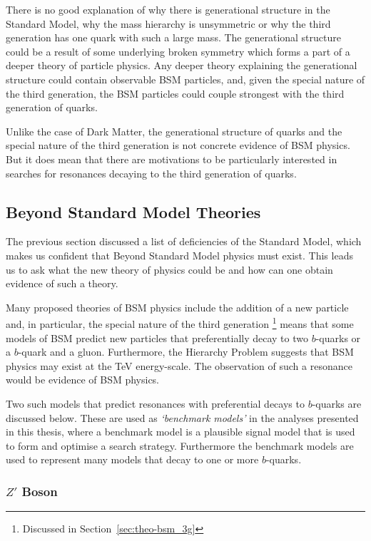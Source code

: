There is no good explanation of why there is generational structure in the Standard Model,
why the mass hierarchy is unsymmetric 
or why the third generation has one quark with such a large mass.
The generational structure could be a result of some underlying broken symmetry
which forms a part of a deeper theory of particle physics.
Any deeper theory explaining the generational structure could contain observable BSM particles,
and, given the special nature of the third generation,
the BSM particles could couple strongest with the third generation of quarks.

Unlike the case of Dark Matter,
the generational structure of quarks
and the special nature of the third generation is not concrete evidence of BSM physics.
But it does mean that there are motivations to be particularly interested in
searches for resonances decaying to the third generation of quarks.

\subsection{Beyond Standard Model Theories}
\label{sec:theo-bsm_models}

The previous section discussed a list of deficiencies of the Standard Model,
which makes us confident that Beyond Standard Model physics must exist.
This leads us to ask what the new theory of physics could be and
how can one obtain evidence of such a theory.

Many proposed theories of BSM physics include the addition of a new particle and,
in particular, the special nature of the third generation
\footnote{Discussed in Section~\ref{sec:theo-bsm_3g}}
means that some models of BSM predict new particles
that preferentially decay to two $b$-quarks or a $b$-quark and a gluon.
Furthermore, the Hierarchy Problem suggests that BSM physics may exist at the TeV energy-scale.
The observation of such a resonance would be evidence of BSM physics.

Two such models that predict resonances with preferential decays to $b$-quarks are discussed below.
These are used as \textit{`benchmark models'} in the analyses presented in this thesis,
where a benchmark model is a plausible signal model that is used to form and optimise a search strategy.
Furthermore the benchmark models are used to represent many models that decay to one or more $b$-quarks.

\subsubsection{$Z'$ Boson}
\label{sec:theo-bsm_zprime}

